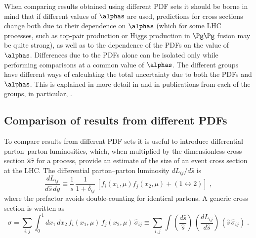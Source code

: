 


When comparing results obtained using different PDF sets it should be
borne in mind that if different values of $\alphas$ are used,
 predictions for cross sections change both due to their dependence on 
$\alphas$ (which for some LHC processes,
such as top-pair production or Higgs 
production in $\Pg\Pg$ fusion may
be quite strong), as well as to the dependence of the PDFs on the
value of $\alphas$. Differences due to the PDFs alone can be isolated
only while performing comparisons at a common value of $\alphas$. The
different groups have different ways of calculating the total uncertainty 
due to both the PDFs and $\alphas$. This is explained in more detail 
in   and in publications from each of the groups, in 
particular, .  




\subsection{Comparison of results from different PDFs}
\label{sec:benchmarking}

To compare results from different PDF sets it is useful to introduce 
differential parton--parton luminosities, which, when multiplied by the 
dimensionless cross section $\hat{s}\hat{\sigma}$ for a process, 
provide an estimate  of 
the size of an event cross section at the LHC. 
The differential parton--parton luminosity $dL_{ij}/d\hat{s}$ is
\begin{equation}
\frac{d L_{ij}}{d\hat{s}\,dy} \equiv 
\frac{1}{s} \, \frac{1}{1+\delta_{ij}} \, 
[f_i(x_1,\mu) f_j(x_2,\mu) + (1\leftrightarrow 2)] \; ,
\label{eq1}
\end{equation}
where the prefactor avoids double-counting for identical partons. A 
generic cross section is written as
\begin{equation}
\sigma = \sum_{i,j} \int_0^1 dx_1 \, dx_2 \, 
f_i(x_1,\mu) \, f_j(x_2,\mu) \, \hat{\sigma}_{ij}
\equiv \sum_{i,j} \int \left(\frac{d\hat{s}}{\hat{s}} \right) 
\, \left(\frac{d L_{ij}}{d\hat{s}}\right) \, 
\left(\hat{s} \,\hat{\sigma}_{ij} \right) \; .
\label{eq:xseclum}
\end{equation}



